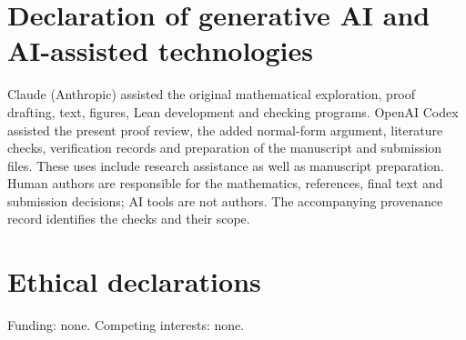\documentclass[preprint,12pt]{elsarticle}
\theoremstyle{definition}
\begin{document}
\section*{Declaration of generative AI and AI-assisted technologies}
Claude (Anthropic) assisted the original mathematical exploration, proof drafting, text, figures, Lean development and checking programs. OpenAI Codex assisted the present proof review, the added normal-form argument, literature checks, verification records and preparation of the manuscript and submission files. These uses include research assistance as well as manuscript preparation. Human authors are responsible for the mathematics, references, final text and submission decisions; AI tools are not authors. The accompanying provenance record identifies the checks and their scope.

\section*{Ethical declarations}
Funding: none. Competing interests: none.
\end{document}
